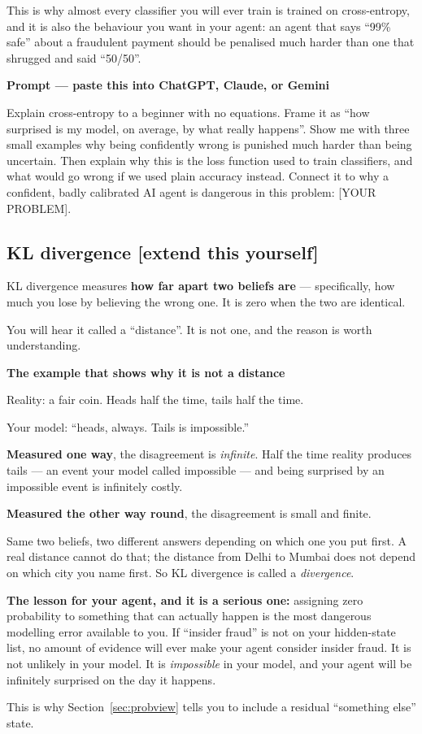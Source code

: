 \documentclass[11pt,a4paper]{article}
\newcommand{\boxtitle}[1]{{\bfseries #1}\par\vspace{2pt}}
\newcommand{\extend}{\hfill{\footnotesize\sffamily\color{sbaccent}[extend this yourself]}}
\newenvironment{learnprompt}
  {\begin{sbbox}\boxtitle{Prompt --- paste this into ChatGPT, Claude, or Gemini}%
   \ttfamily\small\raggedright}
  {\end{sbbox}}
\begin{document}
This is why almost every classifier you will ever train is trained on cross-entropy, and it is
also the behaviour you want in your agent: an agent that says ``99\% safe'' about a fraudulent
payment should be penalised much harder than one that shrugged and said ``50/50''.

\begin{learnprompt}
Explain cross-entropy to a beginner with no equations. Frame it as ``how surprised is my model,
on average, by what really happens''. Show me with three small examples why being confidently
wrong is punished much harder than being uncertain. Then explain why this is the loss function
used to train classifiers, and what would go wrong if we used plain accuracy instead. Connect it
to why a confident, badly calibrated AI agent is dangerous in this problem: [YOUR PROBLEM].
\end{learnprompt}

\subsection{KL divergence \extend}

KL divergence measures \textbf{how far apart two beliefs are} --- specifically, how much you lose
by believing the wrong one. It is zero when the two are identical.

You will hear it called a ``distance''. It is not one, and the reason is worth understanding.

\begin{sbbox}
\boxtitle{The example that shows why it is not a distance}
Reality: a fair coin. Heads half the time, tails half the time.

Your model: ``heads, always. Tails is impossible.''

\textbf{Measured one way}, the disagreement is \emph{infinite}. Half the time reality produces
tails --- an event your model called impossible --- and being surprised by an impossible event is
infinitely costly.

\textbf{Measured the other way round}, the disagreement is small and finite.

Same two beliefs, two different answers depending on which one you put first. A real distance
cannot do that; the distance from Delhi to Mumbai does not depend on which city you name first.
So KL divergence is called a \emph{divergence}.

\textbf{The lesson for your agent, and it is a serious one:} assigning zero probability to
something that can actually happen is the most dangerous modelling error available to you. If
``insider fraud'' is not on your hidden-state list, no amount of evidence will ever make your
agent consider insider fraud. It is not unlikely in your model. It is \emph{impossible} in your
model, and your agent will be infinitely surprised on the day it happens.

This is why Section~\ref{sec:probview} tells you to include a residual ``something else'' state.
\end{sbbox}
\end{document}

